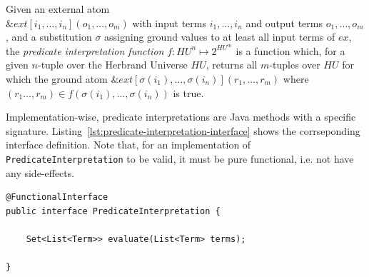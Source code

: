 \begin{definition}
\label{def:external-atom-interpretation}    
 Given an external atom \\ $\&\mathit{ext}[i_1,\ldots,i_n](o_1,\ldots,o_m)$ with input terms $i_1,\ldots,i_n$ and output terms $o_1,\ldots,o_m$, and a substitution $\sigma$ assigning ground values to at least all input terms of $ex$, the \emph{predicate interpretation function} $f: HU^n \mapsto 2^{HU^m}$ is a function which, for a given $n$-tuple over the Herbrand Universe $HU$, returns all $m$-tuples over $HU$ for which the ground atom $\&\mathit{ext}[\sigma(i_1),\ldots,\sigma(i_n)](r_1,\ldots,r_m)$ where $(r_1\ldots,r_m) \in f(\sigma(i_1),\ldots,\sigma(i_n))$ is true.
\end{definition}

Implementation-wise, predicate interpretations are Java methods with a specific signature. Listing~\ref{lst:predicate-interpretation-interface} shows the corrseponding interface definition. Note that, for an implementation of \texttt{PredicateInterpretation} to be valid, it must be pure functional, i.e. not have any side-effects.
\begin{lstlisting}[style=java, label={lst:predicate-interpretation-interface}, caption={Java Interface for Predicate Interpretations}]
@FunctionalInterface
public interface PredicateInterpretation {
    
    Set<List<Term>> evaluate(List<Term> terms);

}    
\end{lstlisting}

